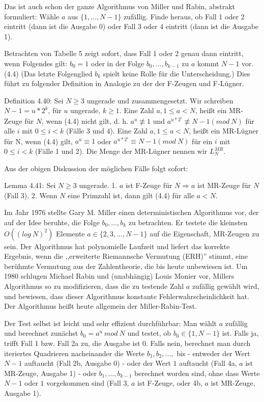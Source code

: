 \documentclass[a4paper]{article}
\begin{document}
\begin{multicols}{3}
        Das ist auch schon der ganze Algorithmus von Miller und Rabin, abstrakt formuliert: Wähle $a$ aus $\{1,...,N-1\}$ zufällig. Finde heraus, ob Fall 1 oder 2 eintritt (dann ist die Ausgabe 0) oder Fall 3 oder 4 eintritt (dann ist die Ausgabe 1).

        Betrachten von Tabelle 5 zeigt sofort, dass Fall 1 oder 2 genau dann eintritt, wenn Folgendes gilt: $b_0=1$ oder in der Folge $b_0,...,b_{k-1}$ zu $a$ kommt $N-1$ vor. (4.4) (Das letzte Folgenglied $b_k$ spielt keine Rolle für die Unterscheidung.) Dies führt zu folgender Definition in Analogie zu der der F-Zeugen und F-Lügner.

        Definition 4.40: Sei $N\geq 3$ ungerade und zusammengesetzt. Wir schreiben $N-1=u*2^k$, für $u$ ungerade, $k\geq 1$. Eine Zahl $a, 1\leq a < N$, heißt ein MR-Zeuge für $N$, wenn (4.4) nicht gilt, d. h. $a^u\not\equiv 1$ und $a^{u*2^i}\not\equiv N-1 (mod\ N)$ für alle $i$ mit $0\leq i < k$ (Fälle 3 und 4). Eine Zahl $a, 1\leq a < N$, heißt ein MR-Lügner für N, wenn (4.4) gilt, $a^u\equiv 1$ oder $a^{u*2^i}\equiv N-1 (mod\ N)$ für ein $i$ mit $0\leq i < k$ (Fälle 1 und 2). Die Menge der MR-Lügner nennen wir $L^{MR}_N$.

        Aus der obigen Diskussion der möglichen Fälle folgt sofort:

        Lemma 4.41: Sei $N\geq 3$ ungerade.
        1. $a$ ist F-Zeuge für $N \Rightarrow a$ ist MR-Zeuge für $N$ (Fall 3).
        2. Wenn $N$ eine Primzahl ist, dann gilt (4.4) für alle $a<N$.

        Im Jahr 1976 stellte Gary M. Miller einen deterministischen Algorithmus vor, der auf der Idee beruhte, die Folge $b_0,...,b_k$ zu betrachten. Er testete die kleinsten $O((log\ N)^2)$ Elemente $a\in\{2,3,...,N-1\}$ auf die Eigenschaft, MR-Zeugen zu sein. Der Algorithmus hat polynomielle Laufzeit und liefert das korrekte Ergebnis, wenn die ,,erweiterte Riemannsche Vermutung (ERH)'' stimmt, eine berühmte Vermutung aus der Zahlentheorie, die bis heute unbewiesen ist. Um 1980 schlugen Michael Rabin und (unabhängig) Louis Monier vor, Millers Algorithmus so zu modifizieren, dass die zu testende Zahl $a$ zufällig gewählt wird, und bewiesen, dass dieser Algorithmus konstante Fehlerwahrscheinlichkeit hat. Der Algorithmus heißt heute allgemein der Miller-Rabin-Test.

        Der Test selbst ist leicht und sehr effizient durchführbar: Man wählt $a$ zufällig und berechnet zunächst $b_0=a^u\ mod\ N$ und testet, ob $b_0\in\{1,N-1\}$ ist. Falls ja, trifft Fall 1 bzw. Fall 2a zu, die Ausgabe ist $0$. Falls nein, berechnet man durch iteriertes Quadrieren nacheinander die Werte $b_1,b_2,...,$ bis
        - entweder der Wert $N-1$ auftaucht (Fall 2b, Ausgabe 0)
        - oder der Wert $1$ auftaucht (Fall 4a, $a$ ist MR-Zeuge, Ausgabe 1)
        - oder $b_1,...,b_{k-1}$ berechnet worden sind, ohne dass Werte $N-1$ oder $1$ vorgekommen sind (Fall 3, $a$ ist F-Zeuge, oder 4b, $a$ ist MR-Zeuge, Ausgabe 1).


\end{multicols}
\end{document}
